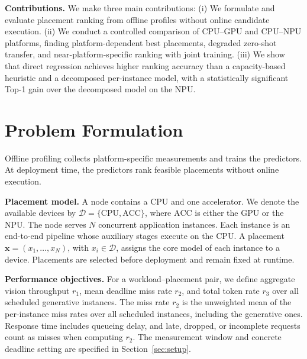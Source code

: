 \documentclass{article}
\begin{document}
\textbf{Contributions.}  We make three main contributions: (i) We formulate and evaluate placement ranking from offline profiles without online candidate execution. (ii) We conduct a controlled comparison of CPU--GPU and CPU--NPU platforms, finding platform-dependent best placements, degraded zero-shot transfer, and near-platform-specific ranking with joint training. (iii) We show that direct regression achieves higher ranking accuracy than a capacity-based heuristic and a decomposed per-instance model, with a statistically significant Top-1 gain over the decomposed model on the NPU.





\section{Problem Formulation}
\label{sec:problem}

Offline profiling collects platform-specific measurements and trains the predictors. At deployment time, the predictors rank feasible placements without online execution.

\textbf{Placement model.} A node contains a CPU and one accelerator. We denote the available devices by $\mathcal{D}=\{\mathrm{CPU},\mathrm{ACC}\}$, where $\mathrm{ACC}$ is either the GPU or the NPU. The node serves $N$ concurrent application instances. Each instance is an end-to-end pipeline whose auxiliary stages execute on the CPU. A placement $\mathbf{x}=(x_1,\ldots,x_N)$, with $x_i\in\mathcal{D}$, assigns the core model of each instance to a device. 
Placements are selected before deployment and remain fixed at runtime.

\textbf{Performance objectives.} For a workload--placement pair, we define aggregate vision throughput $r_1$, mean deadline miss rate $r_2$, and total token rate $r_3$ over all scheduled generative instances. The miss rate $r_2$ is the unweighted mean of the per-instance miss rates over all scheduled instances, including the generative ones. Response time includes queueing delay, and late, dropped, or incomplete requests count as misses when computing $r_2$. The measurement window and concrete deadline setting are specified in Section~\ref{sec:setup}.
\end{document}
